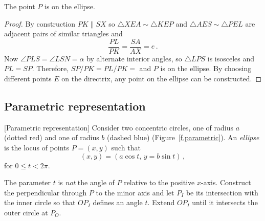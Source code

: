 \begin{theorem}[Art.~55]\label{thm.point-on-an-ellipse}
The point $P$ is on the ellipse.
\end{theorem}
\begin{proof}
By construction $PK\parallel SX$ so $\triangle XEA\sim \triangle KEP$ and $\triangle AES\sim \triangle PEL$ are adjacent pairs of similar triangles and
\[
\frac{PL}{PK}=\frac{SA}{AX}=e\,.
\]
Now $\angle PLS = \angle LSN=\alpha$ by alternate interior angles, so $\triangle LPS$ is isosceles and $PL=SP$. Therefore, $SP/PK=PL/PK=$ and $P$ is on the ellipse. By choosing different points $E$ on the directrix, any point on the ellipse can be constructed.\hqed
\end{proof}

\subsection*{Parametric representation}

\begin{definition}\label{def.parametric}[Parametric representation]
Consider two concentric circles, one of radius $a$ (dotted red) and one of radius $b$ (dashed blue) (Figure~\ref{f.parametric}). An \emph{ellipse} is the locus of points $P=(x,y)$ such that
\[
(x,y)= (a\cos t,\, y = b \sin t)\,,
\]
for $0\le t < 2\pi$.
\end{definition}
The parameter $t$ is \emph{not} the angle of $P$ relative to the positive $x$-axis. Construct the perpendicular through $P$ to the minor axis and let $P_I$ be its intersection with the inner circle so that $OP_I$ defines an angle $t$.  Extend $OP_I$ until it intersects the outer circle at $P_O$. 


